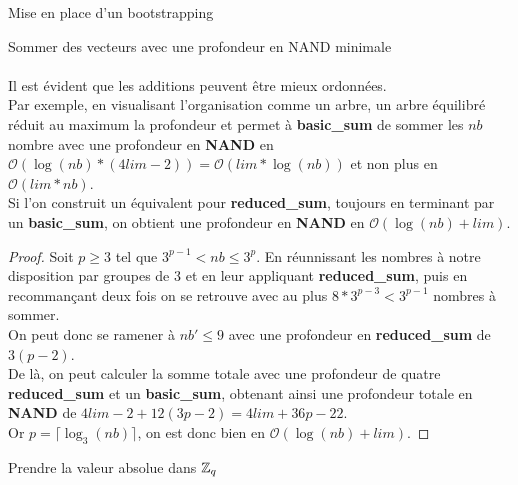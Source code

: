 \begin{section}{Mise en place d'un bootstrapping}
\begin{subsection}{Sommer des vecteurs avec une profondeur en NAND minimale}
\paragraph{}

Il est évident que les additions peuvent être mieux ordonnées. \\
Par exemple, en visualisant l'organisation comme un arbre, un arbre équilibré réduit au maximum la profondeur et permet à \textbf{basic\_sum} de sommer les $nb$ nombre avec une profondeur en \textbf{NAND} en $\mathcal{O}(\log(nb) * (4lim - 2)) = \mathcal{O}(lim * \log(nb))$ et non plus en $\mathcal{O}(lim * nb)$. \\
Si l'on construit un équivalent pour \textbf{reduced\_sum}, toujours en terminant par un \textbf{basic\_sum}, on obtient une profondeur en \textbf{NAND} en $\mathcal{O}(\log(nb) + lim)$.

\begin{proof}
Soit $p \geqslant 3$ tel que $3^{p-1} < nb \leqslant 3^{p}$.
En réunnissant les nombres à notre disposition par groupes de 3 et en leur appliquant \textbf{reduced\_sum}, puis en recommançant deux fois on se retrouve avec au plus $8 * 3^{p-3} < 3^{p-1}$ nombres à sommer. \\
On peut donc se ramener à $nb' \leqslant 9$ avec une profondeur en \textbf{reduced\_sum} de $3(p - 2)$. \\
De là, on peut calculer la somme totale avec une profondeur de quatre \textbf{reduced\_sum} et un \textbf{basic\_sum}, obtenant ainsi une profondeur totale en \textbf{NAND} de $4 lim - 2 + 12(3p - 2) = 4lim + 36p -22$. \\
Or $p = \lceil \log_3(nb) \rceil$, on est donc bien en $\mathcal{O}(\log(nb) + lim)$.
\end{proof}

\end{subsection}
\begin{subsection}{Prendre la valeur absolue dans $\mathbb{Z}_q$}
\end{subsection}
\end{section}
